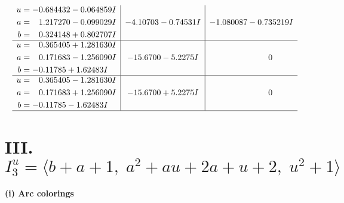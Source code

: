 \documentclass[1p]{elsarticle_modified}
\theoremstyle{definition}
\begin{document}
$$\begin{array}{c|c|c}
\begin{aligned}
u &= -0.684432 - 0.064859 I \\
a &= \phantom{-}1.217270 - 0.099029 I \\
b &= \phantom{-}0.324148 + 0.802707 I\end{aligned}
 & -4.10703 - 0.74531 I & -1.080087 - 0.735219 I \\ \hline\begin{aligned}
u &= \phantom{-}0.365405 + 1.281630 I \\
a &= \phantom{-}0.171683 - 1.256090 I \\
b &= -0.11785 + 1.62483 I\end{aligned}
 & -15.6700 - 5.2275 I & \phantom{-0.000000 } 0 \\ \hline\begin{aligned}
u &= \phantom{-}0.365405 - 1.281630 I \\
a &= \phantom{-}0.171683 + 1.256090 I \\
b &= -0.11785 - 1.62483 I\end{aligned}
 & -15.6700 + 5.2275 I & \phantom{-0.000000 } 0\\
 \hline 
 \end{array}$$\newpage\newpage\renewcommand{\arraystretch}{1}
\centering \section*{III. $I^u_{3}= \langle b+a+1,\;a^2+a u+2 a+u+2,\;u^2+1 \rangle$}
\flushleft \textbf{(i) Arc colorings}\\
\end{document}
